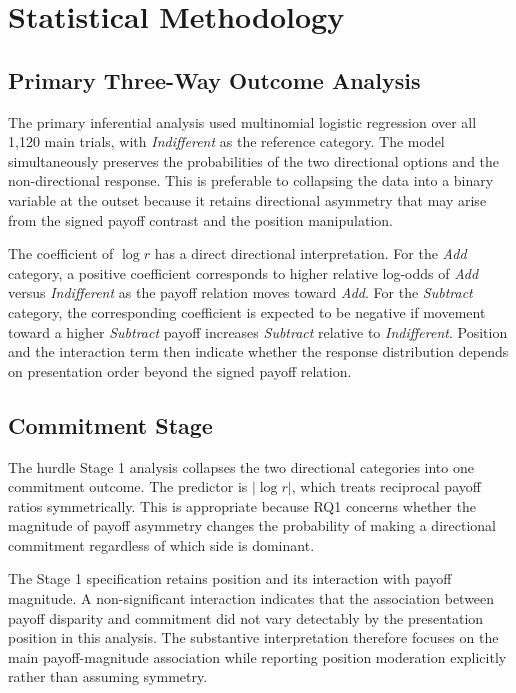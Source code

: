 \documentclass[10pt,journal,compsoc]{IEEEtran}
\begin{document}
\section{Statistical Methodology}
\label{sec:statistics}

\subsection{Primary Three-Way Outcome Analysis}
The primary inferential analysis used multinomial logistic regression over all 1,120 main trials, with \textit{Indifferent} as the reference category. The model simultaneously preserves the probabilities of the two directional options and the non-directional response. This is preferable to collapsing the data into a binary variable at the outset because it retains directional asymmetry that may arise from the signed payoff contrast and the position manipulation.

The coefficient of $\log r$ has a direct directional interpretation. For the \textit{Add} category, a positive coefficient corresponds to higher relative log-odds of \textit{Add} versus \textit{Indifferent} as the payoff relation moves toward \textit{Add}. For the \textit{Subtract} category, the corresponding coefficient is expected to be negative if movement toward a higher \textit{Subtract} payoff increases \textit{Subtract} relative to \textit{Indifferent}. Position and the interaction term then indicate whether the response distribution depends on presentation order beyond the signed payoff relation.

\subsection{Commitment Stage}
The hurdle Stage 1 analysis collapses the two directional categories into one commitment outcome. The predictor is $|\log r|$, which treats reciprocal payoff ratios symmetrically. This is appropriate because RQ1 concerns whether the magnitude of payoff asymmetry changes the probability of making a directional commitment regardless of which side is dominant.

The Stage 1 specification retains position and its interaction with payoff magnitude. A non-significant interaction indicates that the association between payoff disparity and commitment did not vary detectably by the presentation position in this analysis. The substantive interpretation therefore focuses on the main payoff-magnitude association while reporting position moderation explicitly rather than assuming symmetry.
\end{document}
